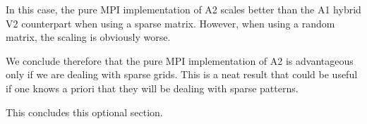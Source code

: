 \documentclass{report}
\begin{document}
In this case, the pure MPI implementation of A2 scales better than the A1 hybrid V2 
counterpart when using a sparse matrix. However, when using a random matrix, the 
scaling is obviously worse.

We conclude therefore that the pure MPI implementation of A2 is advantageous only 
if we are dealing with sparse grids. This is a neat result that could be useful 
if one knows a priori that they will be dealing with sparse patterns. 

This concludes this optional section.
\printbibliography
\end{document}
